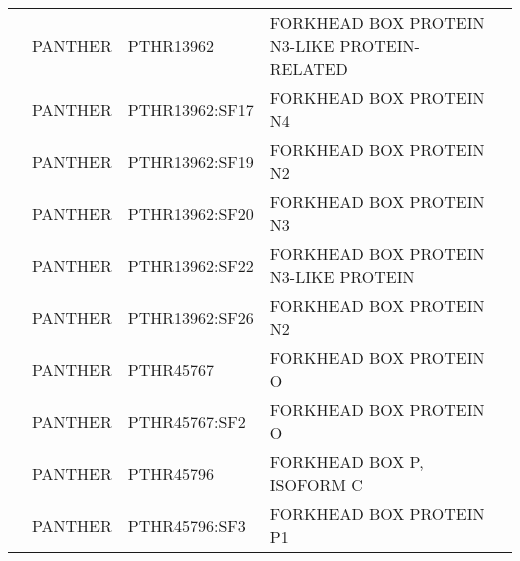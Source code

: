 \documentclass[../main.tex]{subfiles}
\begin{document}
\begin{landscape}
\begin{longtable}{@{}cllll@{}}
		                                & PANTHER              & PTHR13962       & FORKHEAD BOX PROTEIN N3-LIKE PROTEIN-RELATED                                                                                                 & \\
		                                & PANTHER              & PTHR13962:SF17  & FORKHEAD BOX PROTEIN N4                                                                                                                      & \\
		                                & PANTHER              & PTHR13962:SF19  & FORKHEAD BOX PROTEIN N2                                                                                                                      & \\
		                                & PANTHER              & PTHR13962:SF20  & FORKHEAD BOX PROTEIN N3                                                                                                                      & \\
		                                & PANTHER              & PTHR13962:SF22  & FORKHEAD BOX PROTEIN N3-LIKE PROTEIN                                                                                                         & \\
		                                & PANTHER              & PTHR13962:SF26  & FORKHEAD BOX PROTEIN N2                                                                                                                      & \\
		                                & PANTHER              & PTHR45767       & FORKHEAD BOX PROTEIN O                                                                                                                       & \\
		                                & PANTHER              & PTHR45767:SF2   & FORKHEAD BOX PROTEIN O                                                                                                                       & \\
		                                & PANTHER              & PTHR45796       & FORKHEAD BOX P, ISOFORM C                                                                                                                    & \\
		                                & PANTHER              & PTHR45796:SF3   & FORKHEAD BOX PROTEIN P1                                                                                                                      & \\

\end{longtable}
\end{landscape}
\end{document}
